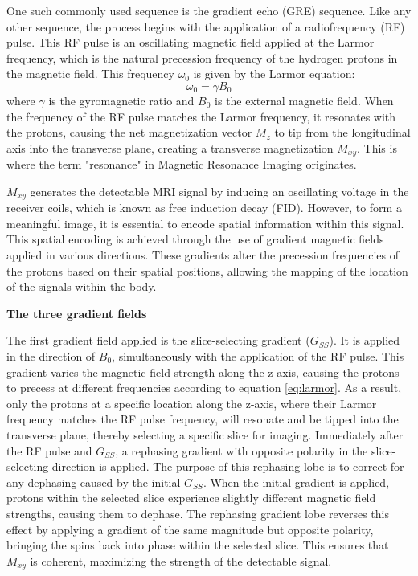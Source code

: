 \documentclass{micro-econ-thesis}
\begin{document}
One such commonly used sequence is the gradient echo (GRE) sequence. Like any other sequence, the process begins with the application of a radiofrequency (RF) pulse. This RF pulse is an oscillating magnetic field applied at the Larmor frequency, which is the natural precession frequency of the hydrogen protons in the magnetic field. This frequency $\omega_0$ is given by the Larmor equation:
\begin{equation}
	\omega_0 = \gamma B_0
	\label{eq:larmor}
\end{equation}
where $\gamma$ is the gyromagnetic ratio and $B_0$ is the external magnetic field.
When the frequency of the RF pulse matches the Larmor frequency, it resonates with the protons, causing the net magnetization vector \textbf{$M_z$} to tip from the longitudinal axis into the transverse plane, creating a transverse magnetization \textbf{$M_{xy}$}. This is where the term "resonance" in Magnetic Resonance Imaging originates. 

\textbf{$M_{xy}$} generates the detectable MRI signal by inducing an oscillating voltage in the receiver coils, which is known as free induction decay (FID). However, to form a meaningful image, it is essential to encode spatial information within this signal. This spatial encoding is achieved through the use of gradient magnetic fields applied in various directions. These gradients alter the precession frequencies of the protons based on their spatial positions, allowing the mapping of the location of the signals within the body.  

\textbf{The three gradient fields}

The first gradient field applied is the slice-selecting gradient ($G_{SS}$). It is applied in the direction of \textbf{$B_0$}, simultaneously with the application of the RF pulse. 
This gradient varies the magnetic field strength along the z-axis, causing the protons to precess at different frequencies according to equation \ref{eq:larmor}. As a result, only the protons at a specific location along the z-axis, where their Larmor frequency matches the RF pulse frequency, will resonate and be tipped into the transverse plane, thereby selecting a specific slice for imaging. Immediately after the RF pulse and $G_{SS}$, a rephasing gradient with opposite polarity in the slice-selecting direction is applied. The purpose of this rephasing lobe is to correct for any dephasing caused by the initial  $G_{SS}$. When the initial gradient is applied, protons within the selected slice experience slightly different magnetic field strengths, causing them to dephase. The rephasing gradient lobe reverses this effect by applying a gradient of the same magnitude but opposite polarity, bringing the spins back into phase within the selected slice. This ensures that \textbf{$M_{xy}$} is coherent, maximizing the strength of the detectable signal.
\end{document}
